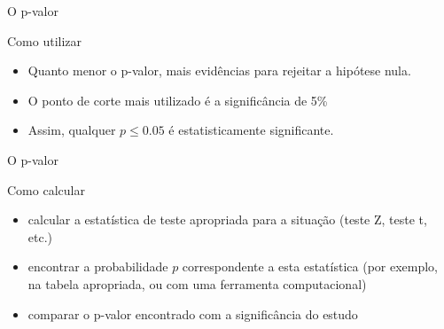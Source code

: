 \documentclass{beamer}
\begin{document}
\begin{frame}{O p-valor}
  \begin{block}{Como utilizar}
    \begin{itemize}
    \item Quanto menor o p-valor, mais evidências para rejeitar a
      hipótese nula.
    \item O ponto de corte mais utilizado é a significância de 5\%
    \item Assim, qualquer $p \le 0.05$ é estatisticamente significante.
    \end{itemize}
  \end{block}
\end{frame}

\begin{frame}{O p-valor}
  \begin{block}{Como calcular}
    \begin{itemize}
    \item calcular a estatística de teste apropriada para a situação
      (teste Z, teste t, etc.)
    \item encontrar a probabilidade $p$ correspondente a esta
      estatística (por exemplo, na tabela apropriada, ou com uma
      ferramenta computacional)
    \item comparar o p-valor encontrado com a significância do estudo
    \end{itemize}
  \end{block}
\end{frame}
\end{document}
